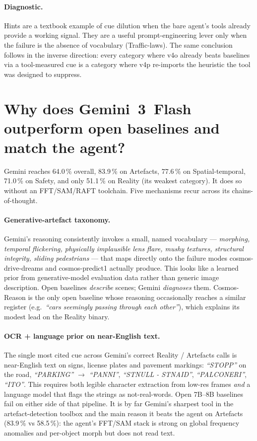 \documentclass[11pt,a4paper]{article}
\newcommand{\pct}[1]{#1\,\%}
\begin{document}
\paragraph{Diagnostic.} Hints are a textbook example of cue dilution
when the bare agent's tools already provide a working signal. They are
a useful prompt-engineering lever only when the failure is the absence
of vocabulary (Traffic-laws). The same conclusion follows in the
inverse direction: every category where v4o already beats baselines via
a tool-measured cue is a category where v4p re-imports the heuristic
the tool was designed to suppress.

\section{Why does Gemini~3~Flash outperform open baselines and match
the agent?}
\label{sec:gemini}

Gemini reaches \pct{64.0} overall, \pct{83.9} on Artefacts, \pct{77.6}
on Spatial-temporal, \pct{71.0} on Safety, and only \pct{51.1} on
Reality (its weakest category). It does so without an FFT/SAM/RAFT
toolchain. Five mechanisms recur across its chains-of-thought.

\paragraph{Generative-artefact taxonomy.} Gemini's reasoning consistently
invokes a small, named vocabulary --- \emph{morphing, temporal
flickering, physically implausible lens flare, mushy textures,
structural integrity, sliding pedestrians} --- that maps directly onto
the failure modes cosmos-drive-dreams and cosmos-predict1 actually
produce. This looks like a learned prior from generative-model
evaluation data rather than generic image description. Open baselines
\emph{describe} scenes; Gemini \emph{diagnoses} them. Cosmos-Reason is
the only open baseline whose reasoning occasionally reaches a similar
register (e.g.~\emph{``cars seemingly passing through each other''}),
which explains its modest lead on the Reality binary.

\paragraph{OCR + language prior on near-English text.} The single most
cited cue across Gemini's correct Reality / Artefacts calls is
near-English text on signs, license plates and pavement markings:
\emph{``STOPP''} on the road,
\emph{``PARKING'' $\to$ ``PANNI''}, \emph{``STNULL - STNAID''},
\emph{``PALCONERI''}, \emph{``ITO''}. This requires both legible
character extraction from low-res frames \emph{and} a language model
that flags the strings as not-real-words. Open 7B--8B baselines fail
on either side of that pipeline. It is by far Gemini's sharpest tool in
the artefact-detection toolbox and the main reason it beats the agent
on Artefacts (\pct{83.9} vs \pct{58.5}): the agent's FFT/SAM stack is
strong on global frequency anomalies and per-object morph but does not
read text.
\end{document}
